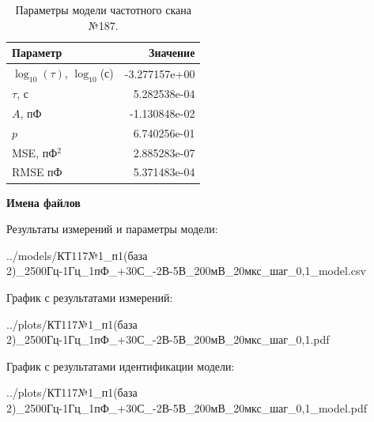 \begin{table}[!ht]
    \centering
    \caption{Параметры модели частотного скана №187.}
    \begin{tabular}{|l|r|}
        \hline
        Параметр                                       & Значение                  \\ \hline
        $\log_{10}(\tau)$, $\log_{10}$(с)              & -3.277157e+00             \\ \hline
        $\tau$, с                                      & 5.282538e-04              \\ \hline
        $A$, пФ                                        & -1.130848e-02             \\ \hline
        $p$                                            & 6.740256e-01              \\ \hline
        MSE, пФ$^2$                                    & 2.885283e-07              \\ \hline
        RMSE пФ                                        & 5.371483e-04              \\ \hline
    \end{tabular}
    \label{table:frequency_scan_model_187}
\end{table}

\textbf{Имена файлов}

Результаты измерений и параметры модели:

\scriptsize../models/КТ117№1\_п1(база 2)\_2500Гц-1Гц\_1пФ\_+30С\_-2В-5В\_200мВ\_20мкс\_шаг\_0,1\_model.csv
\normalsize

График с результатами измерений:

\scriptsize../plots/КТ117№1\_п1(база 2)\_2500Гц-1Гц\_1пФ\_+30С\_-2В-5В\_200мВ\_20мкс\_шаг\_0,1.pdf
\normalsize

График с результатами идентификации модели:

\scriptsize../plots/КТ117№1\_п1(база 2)\_2500Гц-1Гц\_1пФ\_+30С\_-2В-5В\_200мВ\_20мкс\_шаг\_0,1\_model.pdf
\normalsize


